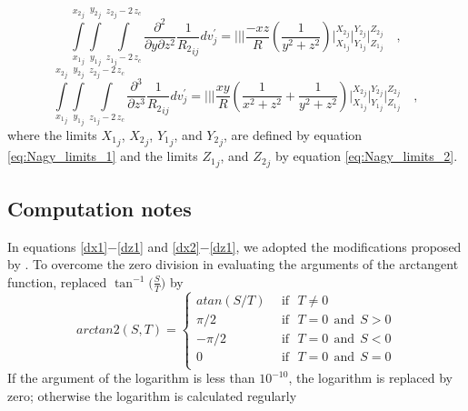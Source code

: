 \documentclass[journal abbreviation, manuscript]{copernicus}
\begin{document}
\begin{equation}
\int\limits_{{x_{1}}_{j}}^{{x_{2}}_{j}} \int\limits_{{y_{1}}_{j}}^{{y_{2}}_{j}} \int\limits_{{z_{1}}_{j} - 2 \, z_c}^{{z_{2}}_{j} - 2 \, z_c}
\frac{\partial^{2}  }{\partial y \partial z^{2}} {\frac{1}{{R_2}_{ij}}} dv_{j}^{\prime} =
\Bigg|\Bigg|\Bigg|
\frac{- x z}{R} 
\left( \frac{1}{y^{2} + z^{2}} \right)
\Bigg|_{{X_1}_{j}}^{{X_2}_{j}} \Bigg|_{{Y_1}_{j}}^{{Y_2}_{j}} \Bigg|_{{Z_1}_{j}}^{{Z_2}_{j}} \quad ,
\label{syzz}
\end{equation}
\begin{equation}
\int\limits_{{x_{1}}_{j}}^{{x_{2}}_{j}} \int\limits_{{y_{1}}_{j}}^{{y_{2}}_{j}} \int\limits_{{z_{1}}_{j} - 2 \, z_c}^{{z_{2}}_{j} - 2 \, z_c}
\frac{\partial^{3}  }{\partial z^{3}} {\frac{1}{{R_2}_{ij}}} dv_{j}^{\prime} =
\Bigg|\Bigg|\Bigg|
\frac{ x y}{R} 
\left( \frac{1}{x^{2} + z^{2}} + \frac{1}{y^{2} + z^{2}} \right)
\Bigg|_{{X_1}_{j}}^{{X_2}_{j}} \Bigg|_{{Y_1}_{j}}^{{Y_2}_{j}} \Bigg|_{{Z_1}_{j}}^{{Z_2}_{j}} \quad ,
\label{sz3}
\end{equation}
where the limits ${X_1}_{j}$, ${X_2}_{j}$, ${Y_1}_{j}$, and ${Y_2}_{j}$, are defined 
by equation \ref{eq:Nagy_limits_1} and the limits ${Z_1}_{j}$, and ${Z_2}_{j}$ by
equation \ref{eq:Nagy_limits_2}.

\subsection{Computation notes}

In equations \ref{dx1}$-$\ref{dz1} and \ref{dx2}$-$\ref{dz1}, we adopted the modifications proposed by \cite{Fukushima2020}.
To overcome the zero division in evaluating the arguments of the arctangent function, \cite{Fukushima2020} replaced  $\tan^{-1} \big( \frac{S}{T} \big)$ by 
\begin{equation}
arctan2(S,T) = 
  \left\{ \begin{aligned}
      atan (S/T) & \:\: \mbox{if} \: \:\:  T \neq 0 \\
      \pi /2 & \:\: \mbox{if} \: \:\:  T = 0  \: \: \mbox{and} \: \:S > 0 \\
      -\pi /2 & \:\: \mbox{if} \: \:\:  T = 0  \: \: \mbox{and} \: \:S < 0 \\
         0 & \:\: \mbox{if} \: \:\:  T = 0  \: \: \mbox{and} \: \:S = 0 \\
  \end{aligned} \right.
\label{eq:arctan2}  
\end{equation}
If the argument of the logarithm is less than $10^{-10}$, the logarithm is replaced by zero; otherwise the logarithm is  calculated regularly
\end{document}
